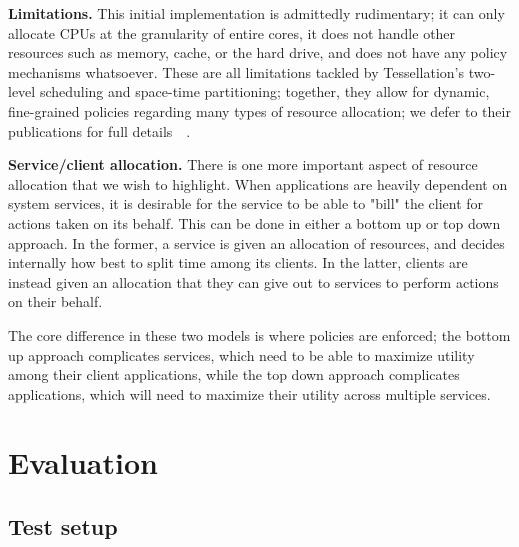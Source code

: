 \documentclass[letterpaper,twocolumn,11pt]{article}
\begin{document}
\textbf{Limitations.} This initial implementation is admittedly rudimentary; it can only allocate CPUs at the granularity of entire cores, it does not handle other resources such as memory, cache, or the hard drive, and does not have any policy mechanisms whatsoever. These are all limitations tackled by Tessellation's two-level scheduling and space-time partitioning; together, they allow for dynamic, fine-grained policies regarding many types of resource allocation; we defer to their publications for full details~\cite{liu09tessellation}~\cite{tessellation-hotpar10}.

\textbf{Service/client allocation.} There is one more important aspect of resource allocation that we wish to highlight. When applications are heavily dependent on system services, it is desirable for the service to be able to "bill" the client for actions taken on its behalf. This can be done in either a bottom up or top down approach. In the former, a service is given an allocation of resources, and decides internally how best to split time among its clients. In the latter, clients are instead given an allocation that they can give out to services to perform actions on their behalf.

The core difference in these two models is where policies are enforced; the bottom up approach complicates services, which need to be able to maximize utility among their client applications, while the top down approach complicates applications, which will need to maximize their utility across multiple services.

\section{Evaluation}

\subsection{Test setup}
\end{document}
